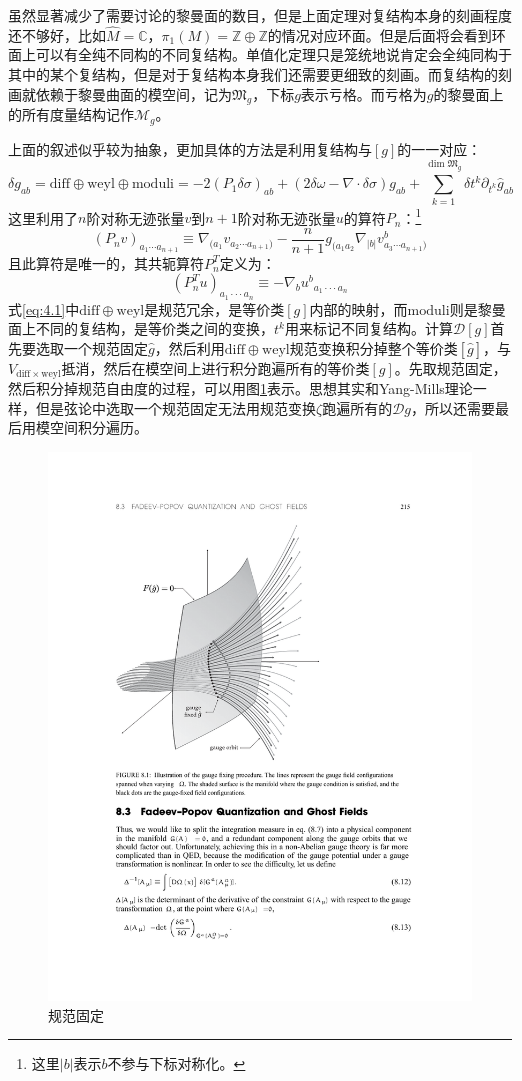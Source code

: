 虽然显著减少了需要讨论的黎曼面的数目，但是上面定理对复结构本身的刻画程度还不够好，比如$\hat M = \mathbb{C}$，$\pi_1(M)=\mathbb{Z}\oplus \mathbb{Z}$的情况对应环面。但是后面将会看到环面上可以有全纯不同构的不同复结构。单值化定理只是笼统地说肯定会全纯同构于其中的某个复结构，但是对于复结构本身我们还需要更细致的刻画。而复结构的刻画就依赖于黎曼曲面的模空间，记为$\mathfrak{M}_g$，下标$g$表示亏格。而亏格为$g$的黎曼面上的所有度量结构记作$\mathcal{M}_g$。

上面的叙述似乎较为抽象，更加具体的方法是利用复结构与$[g]$的一一对应：
\begin{equation}
	\label{eq:4.1}
	\delta g_{ab}=\mathrm{diff}\oplus\mathrm{weyl}\oplus\mathrm{moduli}=-2(P_1\delta\sigma)_{ab}+(2\delta\omega-\nabla\cdot\delta\sigma)g_{ab}+\sum_{k=1}^{\dim\mathfrak{M}_g}\delta t^k\partial_{t^k}\hat{g}_{ab}
\end{equation}
这里利用了$n$阶对称无迹张量$v$到$n+1$阶对称无迹张量$u$的算符$P_n$：\footnote{这里$|b|$表示$b$不参与下标对称化。}
\begin{equation}
	(P_nv)_{a_1\cdots a_{n+1}}\equiv\nabla_{(a_1}v_{a_2\cdots a_{n+1})}-\frac{n}{n+1}g_{(a_1a_2}\nabla_{|b|}v_{a_3\cdots a_{n+1})}^b
\end{equation}
且此算符是唯一的，其共轭算符$P_n^T$定义为：
\begin{equation}
	(P_n^Tu)_{a_1\cdot\cdot\cdot a_n}\equiv-\nabla_bu^b{}_{a_1\cdot\cdot\cdot a_n}
\end{equation}
式\ref{eq:4.1}中$\mathrm{diff}\oplus\mathrm{weyl}$是规范冗余，是等价类$[g]$内部的映射，而$\mathrm{moduli}$则是黎曼面上不同的复结构，是等价类之间的变换，$t^k$用来标记不同复结构。计算$\mathcal{D}[g]$首先要选取一个规范固定$\hat{g}$，然后利用$\mathrm{diff}\oplus\mathrm{weyl}$规范变换积分掉整个等价类$[\hat{g}]$，与$V_{\mathrm{diff}\times\mathrm{weyl}}$抵消，然后在模空间上进行积分跑遍所有的等价类$[g]$。先取规范固定，然后积分掉规范自由度的过程，可以用图\ref{fig:3}表示。思想其实和Yang-Mills理论一样，但是弦论中选取一个规范固定无法用规范变换$\zeta$跑遍所有的$\mathcal{D}g$，所以还需要最后用模空间积分遍历。
\begin{figure}[htbp]
	\centering
	\includegraphics[width=0.5\linewidth]{figs/fig3.pdf}
	\caption{规范固定}
	\label{fig:3}
\end{figure}


